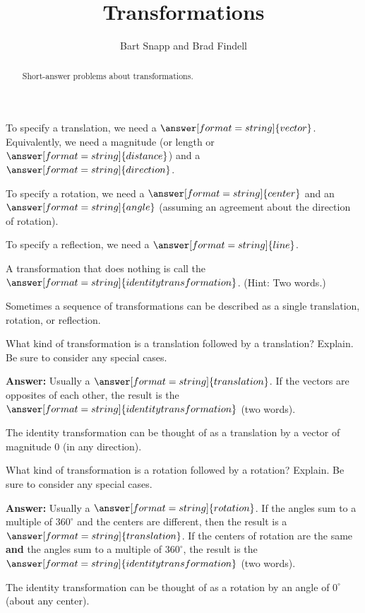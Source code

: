 \documentclass[nooutcomes]{ximera}
\title{Transformations}
\author{Bart Snapp and Brad Findell}
\begin{document}
\begin{abstract}
Short-answer problems about transformations. 
\end{abstract}
\maketitle


\begin{question}
To specify a translation, we need a $\answer[format=string]{vector}$.  Equivalently, we need a magnitude (or length or $\answer[format=string]{distance}$) and a $\answer[format=string]{direction}$.  
\end{question}

\begin{question}
To specify a rotation, we need a $\answer[format=string]{center}$ and an $\answer[format=string]{angle}$ (assuming an agreement about the direction of rotation).  
\end{question}

\begin{question}
To specify a reflection, we need a $\answer[format=string]{line}$.  
\end{question}

\begin{question}
A transformation that does nothing is call the $\answer[format=string]{identity transformation}$.  (Hint: Two words.)
\end{question}

Sometimes a sequence of transformations can be described as a single translation, rotation, or reflection.  

\begin{question}
What kind of transformation is a translation followed by a translation?  Explain.  Be sure to consider any special cases.  

\textbf{Answer:} Usually a $\answer[format=string]{translation}$.  If the vectors are opposites of each other, the result 
is the $\answer[format=string]{identity transformation}$ (two words).  
\begin{feedback}[correct]
The identity transformation can be thought of as a translation by a vector of magnitude $0$ (in any direction).
\end{feedback}
\end{question}

\begin{question}
What kind of transformation is a rotation followed by a rotation?  Explain.  Be sure to consider any special cases.   

\textbf{Answer:} Usually a $\answer[format=string]{rotation}$.  If the angles sum to a multiple of $360^\circ$ and the centers are different, then the result is a $\answer[format=string]{translation}$.  If the centers of rotation are the same \textbf{and} the angles sum to a multiple of $360^\circ$, the result is the $\answer[format=string]{identity transformation}$ (two words).  
\begin{feedback}[correct]
The identity transformation can be thought of as a rotation by an angle of $0^\circ$ (about any center).
\end{feedback}
\end{question}
\end{document}
